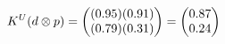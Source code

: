\documentclass[preview]{standalone}
\begin{document}
\begin{align*}
\special{dvisvgm:raw <g id='unique000'>}K^U(d \otimes p) = \begin{pmatrix} (0.95)(0.91) \\ (0.79)(0.31) \end{pmatrix} = \begin{pmatrix} 0.87 \\ 0.24 \end{pmatrix}\special{dvisvgm:raw </g>}
\end{align*}
\end{document}
